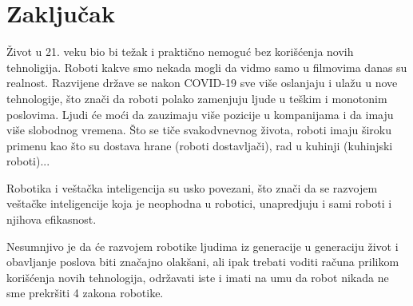 \documentclass{article}
\begin{document}
	\section{Zaključak}
 Život u 21. veku bio bi težak i praktično nemoguć bez korišćenja novih tehnoligija. Roboti kakve smo nekada mogli da vidmo samo u filmovima danas su realnost. Razvijene države se nakon COVID-19 sve više oslanjaju i ulažu u nove tehnologije, što znači da roboti polako zamenjuju ljude u teškim i monotonim poslovima. Ljudi će moći da zauzimaju više pozicije u kompanijama i da imaju više slobodnog vremena. Što se tiče svakodvnevnog života, roboti imaju široku primenu kao što su dostava hrane (roboti dostavljači), rad u kuhinji (kuhinjski roboti)...

 Robotika i veštačka inteligencija su usko povezani, što znači da se razvojem veštačke inteligencije koja je neophodna u robotici, unapredjuju i sami roboti i njihova efikasnost. 

 Nesumnjivo je da će razvojem robotike ljudima iz generacije u generaciju život i obavljanje poslova biti značajno olakšani, ali ipak trebati voditi računa prilikom korišćenja novih tehnologija, održavati iste i imati na umu da robot nikada ne sme prekršiti 4 zakona robotike.
	
\pagebreak
\end{document}

